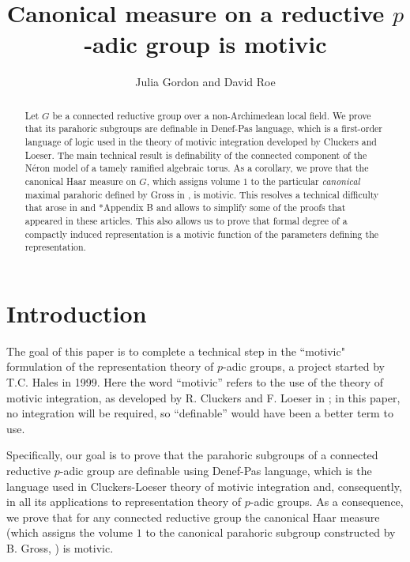 \documentclass{amsart}
\title[]{Canonical measure on a reductive $p$-adic group is motivic}
\author{Julia Gordon and David Roe}
\theoremstyle{plain}
\theoremstyle{definition}
\begin{document}
\maketitle
\begin{abstract}  Let $G$ be a connected reductive group over a non-Archimedean local field. 
We prove that its parahoric subgroups are definable in Denef-Pas language, which is a first-order language of logic used in the theory of motivic integration developed by Cluckers and Loeser. The main technical result is definability of the connected component of the N\'eron model of a tamely ramified algebraic torus.  As a corollary, we prove that the canonical Haar measure on $G$, which assigns volume $1$ to the particular \emph{canonical} maximal parahoric defined by Gross in \cite{gross:motive}, is motivic. This  resolves a technical difficulty that arose in \cite{CGH-2} and \cite{S-T}*{Appendix B} and allows to simplify some of the proofs that appeared in these articles. 
This also allows us to prove that formal degree of a compactly induced representation is a motivic function of the parameters defining the representation. 
\end{abstract}

\section{Introduction}
The goal of this paper is to complete a technical step in the 
``motivic" formulation of 
the representation theory of $p$-adic groups, a project started by T.C. Hales in 1999. 
Here  the word ``motivic'' refers to the use of the theory of motivic integration, as developed by R. Cluckers and F. Loeser in \cite{cluckers-loeser}; in this paper, no integration will be required, so ``definable'' would have been a better term to use. 

Specifically, our goal is to prove that the parahoric subgroups of a connected reductive $p$-adic group
are definable using Denef-Pas language, which is the language used in Cluckers-Loeser theory of motivic integration and, consequently,  in all its applications to representation theory of $p$-adic groups. As a consequence, we  prove that for any connected reductive group the canonical Haar measure 
(which assigns the volume $1$ to the canonical parahoric subgroup constructed by B. Gross,  \cite{gross:motive}) is motivic.
\end{document}
